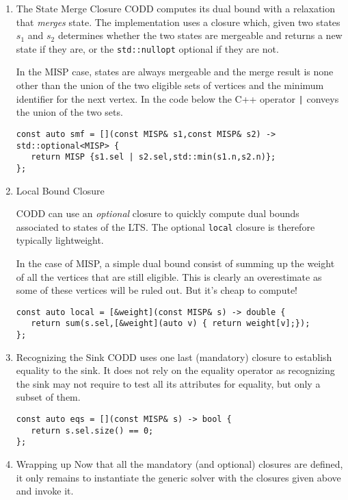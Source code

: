 \documentclass[11pt]{article}
\begin{document}
\begin{enumerate}
\item The State Merge Closure
\label{sec:org9c6f13a}
CODD computes its dual bound with a relaxation that \emph{merges} state. The implementation uses a closure which, given two states \(s_1\) and \(s_2\) determines
whether the two states are mergeable and returns a new state if they are, or the
\texttt{std::nullopt} optional if they are not.

In the MISP case, states are always mergeable and the merge result is none other
than the union of the two eligible sets of vertices and the minimum identifier for the next vertex. In the code below the C++ operator \texttt{|} conveys the union of the
two sets.
\begin{verbatim}
const auto smf = [](const MISP& s1,const MISP& s2) -> std::optional<MISP> {
   return MISP {s1.sel | s2.sel,std::min(s1.n,s2.n)};
};
\end{verbatim}

\item Local Bound Closure
\label{sec:org15d9214}
\begin{caution}
CODD can use an \emph{optional} closure to quickly compute dual bounds associated to
states of the LTS. The optional \texttt{local} closure is therefore typically lightweight.
\end{caution}
In the case of MISP, a simple dual bound consist of summing up the weight of all the vertices that are still eligible. This is clearly an overestimate as some of these vertices will be ruled out. But it's cheap to compute!
\begin{verbatim}
const auto local = [&weight](const MISP& s) -> double {
   return sum(s.sel,[&weight](auto v) { return weight[v];});
};      
\end{verbatim}

\item Recognizing the Sink
\label{sec:org74ff220}
CODD uses one last (mandatory) closure to establish equality to the sink. It does not rely on the equality operator as recognizing the sink may not require to test all its attributes for equality, but only a subset of them.
\begin{verbatim}
const auto eqs = [](const MISP& s) -> bool {
   return s.sel.size() == 0;
};
\end{verbatim}

\item Wrapping up
\label{sec:org2df9d93}
Now that all the mandatory (and optional) closures are defined, it only remains to
instantiate the generic solver with the closures given above and invoke it.


\end{enumerate}
\end{document}
